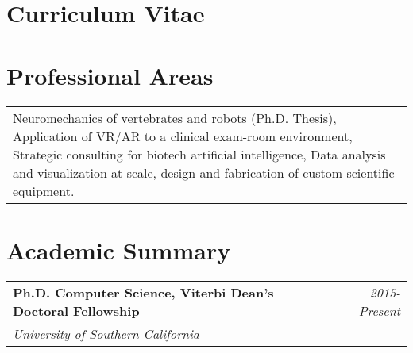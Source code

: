 \documentclass[10pt,a4paper]{article}
\begin{document}
  \newpage


\vspace*{-10mm}\section*{\textbf{Curriculum Vitae}}
\centering{\today}
\vspace*{8mm}\section*{Professional Areas}


  \vspace*{2mm}
  \begin{tabularx}{17cm}{X}
  Neuromechanics of vertebrates and robots (Ph.D. Thesis), Application of VR/AR to a clinical exam-room environment, Strategic consulting for biotech artificial intelligence, Data analysis and visualization at scale, design and fabrication of custom scientific equipment.
  \end{tabularx}

  \vspace*{5mm}\section*{Academic Summary}

  \vspace*{0mm}\noindent\begin{tabularx}{17cm}{X r}
    \textbf{Ph.D. Computer Science, Viterbi Dean's Doctoral Fellowship} & \textit{2015-Present} \\
    \textit{University of Southern California}
  \end{tabularx} 
\end{document}
